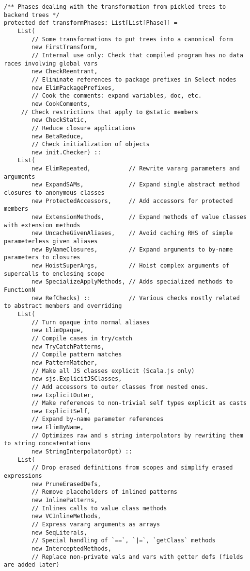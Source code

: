 \documentclass[letterpaper,12pt,titlepage,oneside,final]{book}
\begin{document}
\begin{verbatim}
/** Phases dealing with the transformation from pickled trees to backend trees */
protected def transformPhases: List[List[Phase]] =
	List(
		// Some transformations to put trees into a canonical form
		new FirstTransform,
		// Internal use only: Check that compiled program has no data races involving global vars         
		new CheckReentrant,
		// Eliminate references to package prefixes in Select nodes         
		new ElimPackagePrefixes,    
		// Cook the comments: expand variables, doc, etc.
		new CookComments,         
	 // Check restrictions that apply to @static members  
		new CheckStatic,   
		// Reduce closure applications        
		new BetaReduce,      
		// Check initialization of objects       
		new init.Checker) ::        
	List(
		new ElimRepeated,           // Rewrite vararg parameters and arguments
		new ExpandSAMs,             // Expand single abstract method closures to anonymous classes
		new ProtectedAccessors,     // Add accessors for protected members
		new ExtensionMethods,       // Expand methods of value classes with extension methods
		new UncacheGivenAliases,    // Avoid caching RHS of simple parameterless given aliases
		new ByNameClosures,         // Expand arguments to by-name parameters to closures
		new HoistSuperArgs,         // Hoist complex arguments of supercalls to enclosing scope
		new SpecializeApplyMethods, // Adds specialized methods to FunctionN
		new RefChecks) ::           // Various checks mostly related to abstract members and overriding
	List(
	 	// Turn opaque into normal aliases
		new ElimOpaque,            
		// Compile cases in try/catch
		new TryCatchPatterns,      
		// Compile pattern matches
		new PatternMatcher,         
		// Make all JS classes explicit (Scala.js only)
		new sjs.ExplicitJSClasses,  
		// Add accessors to outer classes from nested ones.
		new ExplicitOuter,          
		// Make references to non-trivial self types explicit as casts
		new ExplicitSelf,           
		// Expand by-name parameter references
		new ElimByName,             
		// Optimizes raw and s string interpolators by rewriting them to string concatentations
		new StringInterpolatorOpt) :: 
	List(
	 	// Drop erased definitions from scopes and simplify erased expressions
		new PruneErasedDefs,
		// Remove placeholders of inlined patterns       
		new InlinePatterns,    
		// Inlines calls to value class methods     
		new VCInlineMethods,  
		// Express vararg arguments as arrays      
		new SeqLiterals, 
		// Special handling of `==`, `|=`, `getClass` methods           
		new InterceptedMethods, 
		// Replace non-private vals and vars with getter defs (fields are added later)    

\end{verbatim}
\end{document}
